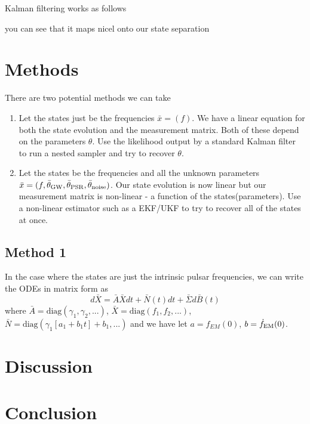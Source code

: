 \documentclass[fleqn,usenatbib,useAMS]{mnras}
\begin{document}
Kalman filtering works as follows


you can see that it maps nicel onto our state separation 





\section{Methods}


There are two potential methods we can take

\begin{enumerate}
	\item Let the states just be the frequencies $\bar{x} = (f)$. We have a linear equation for both the state evolution and the measurement matrix. Both of these depend on the parameters $\theta$. Use the likelihood output by a standard Kalman filter to run a nested sampler and try to recover $\theta$.
	\item Let the states be the frequencies and all the unknown parameters $\bar{x} = (f, \bar{\theta}_{\rm GW},\bar{\theta}_{\rm PSR},\bar{\theta}_{\rm noise})$. Our state evolution is now linear but our measurement matrix is non-linear - a function of the states(parameters). Use a non-linear estimator such as a EKF/UKF to try to recover all of the states at once.
\end{enumerate}


\subsection{Method 1}


In the case where the states are just the intrinsic pulsar frequencies, we can write the ODEs in matrix form as
\begin{equation}
	d\bar{X} = \bar{A} \bar{X} dt + \bar{N}(t) dt + \bar{\Sigma} d\bar{B}(t) 
\end{equation}
where $\bar{A} = \text{diag}(\gamma_1, \gamma_2,...)$,  $\bar{X} = \text{diag}(f_1, f_2,...)$, $\bar{N} =\text{diag}(\gamma_1[a_1+b_1t] + b_1, ...)$
and we have let $a = f_{EM}(0)$, $b = \dot{f}_{\rm EM}(0)$.







\section{Discussion}

\section{Conclusion}
\end{document}
